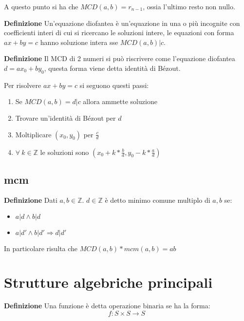 \documentclass{article}
\begin{document}
\noindent A questo punto si ha che $MCD(a,b)=r_{n-1}$, ossia l'ultimo resto non nullo.\newline

\noindent\textbf{Definizione} Un'equazione diofantea è un'equazione in una o più incognite con coefficienti interi di cui si ricercano le soluzioni intere, le equazioni con forma $ax+by=c$ hanno soluzione intera sse $MCD(a,b)|c$.\newline

\noindent\textbf{Definizione} Il MCD di 2 numeri si può riscrivere come l'equazione diofantea $d=ax_0+by_0$, questa forma viene detta identità di Bézout.\newline

\noindent Per risolvere $ax+by=c$ si seguono questi passi:
\begin{enumerate}
    \item Se $MCD(a,b)=d|c$ allora ammette soluzione
    \item Trovare un'identità di Bézout per $d$
    \item Moltiplicare $(x_0,y_0)$ per $\frac{c}{d}$
    \item $\forall\ k\in\mathbb{Z}$ le soluzioni sono $(x_0+k*\frac{b}{d},y_0-k*\frac{a}{d})$
\end{enumerate}

\subsection{mcm}

\textbf{Definizione} Dati $a,b\in\mathbb{Z}$. $d\in\mathbb{Z}$ è detto minimo comune multiplo di $a,b$ se:
\begin{itemize}
    \item $a|d\wedge b|d$
    \item $a|d'\wedge b|d'\Rightarrow d|d'$\newline
\end{itemize}

\noindent In particolare risulta che $MCD(a,b)*mcm(a,b)=ab$\newline

\section{Strutture algebriche principali}

\textbf{Definizione} Una funzione è detta operazione binaria se ha la forma:
$$f:S\times S\rightarrow S$$\newline
\end{document}
